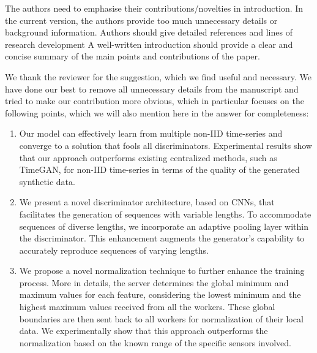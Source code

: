 \documentclass{article}
\begin{document}
\RC The authors need to emphasise their contributions/novelties in introduction. In the current version, the authors provide too much unnecessary details or background information. Authors should give detailed references and lines of research development A well-written introduction should provide a clear and concise summary of the main points and contributions of the paper.

\AR We thank the reviewer for the suggestion, which we find useful and necessary. We have done our best to remove all unnecessary details from the manuscript and tried to make our contribution more obvious, which in particular focuses on the following points, which we will also mention here in the answer for completeness:
    \begin{enumerate}
        \item Our model can effectively learn from multiple non-IID time-series and converge to a solution that fools all discriminators. Experimental results show that our approach outperforms existing centralized methods, such as TimeGAN, for non-IID time-series in terms of the quality of the generated synthetic data.
        \item We present a novel discriminator architecture, based on CNNs, that facilitates the generation of sequences with variable lengths. To accommodate sequences of diverse lengths, we incorporate an adaptive pooling layer within the discriminator. This enhancement augments the generator's capability to accurately reproduce sequences of varying lengths.
        \item We propose a novel normalization technique to further enhance the training process. More in details, the server determines the global minimum and maximum values for each feature, considering the lowest minimum and the highest maximum values received from all the workers. These global boundaries are then sent back to all workers for normalization of their local data. We experimentally show that this approach outperforms the normalization based on the known range of the specific sensors involved.
        \end{enumerate}
\end{document}
